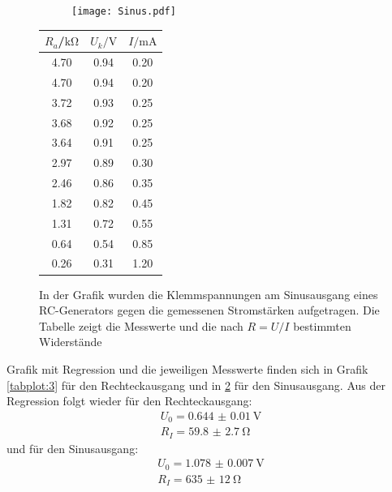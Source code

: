 \begin{figure}[h]
  \begin{subfigure}{0.74\textwidth}
  \centering
    \texttt{[image: Sinus.pdf]}
    \label{sub:7}
    \qquad
  \end{subfigure}
  \begin{subtable}{0.25\textwidth}
  \centering
    \begin{tabular}{c c c}
    \toprule
    $R_a$/$\si{\kilo\ohm}$ & $U_{k}/\si{\volt}$ & $I/\si{\milli\ampere}$ \\
    \midrule
    4.70 & 0.94 & 0.20 \\
    4.70 & 0.94 & 0.20 \\
    3.72 & 0.93 & 0.25 \\
    3.68 & 0.92 & 0.25 \\
    3.64 & 0.91 & 0.25 \\
    2.97 & 0.89 & 0.30 \\
    2.46 & 0.86 & 0.35 \\
    1.82 & 0.82 & 0.45 \\
    1.31 & 0.72 & 0.55 \\
    0.64 & 0.54 & 0.85 \\
    0.26 & 0.31 & 1.20 \\
    \bottomrule
    \end{tabular}
    \label{sub:8}
    \qquad
  \end{subtable}
  \caption{In der Grafik wurden die Klemmspannungen am Sinusausgang eines RC-Generators
  gegen die gemessenen Stromstärken aufgetragen. Die Tabelle zeigt die Messwerte und die
   nach $R = U/I$ bestimmten Widerstände}
  \label{tabplot:4}
\end{figure}
Grafik mit Regression und die jeweiligen Messwerte finden sich in Grafik \ref{tabplot:3} für den
Rechteckausgang und in \ref{tabplot:4} für den Sinusausgang. Aus der Regression folgt wieder für
den Rechteckausgang:
\begin{equation*}
  \begin{split}
    U_0 = \SI{0.644(10)}{\volt}\\
    R_I = \SI{59.8(27)}{\ohm}
  \end{split}
\end{equation*}
und für den Sinusausgang:
\begin{equation*}
  \begin{split}
    U_0 = \SI{1.078(7)}{\volt}\\
    R_I = \SI{635(12)}{\ohm}
  \end{split}
\end{equation*}
\newpage
